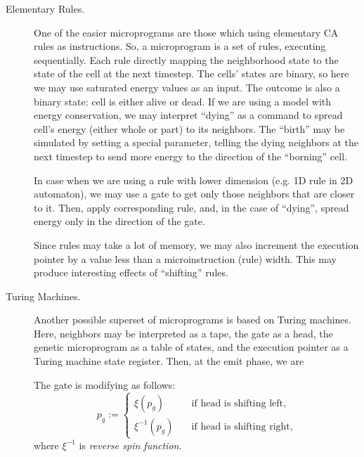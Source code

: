 \documentclass[a4paper,12pt,tikz,UTF8]{article}
\begin{document}
\begin{description}
      \item [Elementary Rules.] One of the easier microprograms are those which using elementary CA rules as instructions. So, a microprogram is a set of rules, executing sequentially. Each rule directly mapping the neighborhood state to the state of the cell at the next timestep. The cells' states are binary, so here we may use saturated energy values as an input. The outcome is also a binary state: cell is either alive or dead. If we are using a model with energy conservation, we may interpret ``dying'' as a command to spread cell's energy (either whole or part) to its neighbors. The ``birth'' may be simulated by setting a special parameter, telling the dying neighbors at the next timestep to send more energy to the direction of the ``borning'' cell.

        In case when we are using a rule with lower dimension (e.g. 1D rule in 2D automaton), we may use a gate to get only those neighbors that are closer to it. Then, apply corresponding rule, and, in the case of ``dying'', spread energy only in the direction of the gate.

        Since rules may take a lot of memory, we may also increment the execution pointer by a value less than a microinstruction (rule) width. This may produce interesting effects of ``shifting'' rules.

      \item [Turing Machines.] Another possible superset of microprograms is based on Turing machines. Here, neighbors may be interpreted as a tape, the gate as a head, the genetic microprogram as a table of states, and the execution pointer as a Turing machine state register. Then, at the emit phase, we are 

        The gate is modifying as follows:
        \begin{equation}
          p_g := 
          \begin{cases}
            \xi(p_g) \quad & \text{if head is shifting left},\\
            \xi^{-1}(p_g) \quad & \text{if head is shifting right},
          \end{cases}
        \end{equation}
        where $\xi^{-1}$ is \textit{reverse spin function}.


\end{description}
\end{document}
